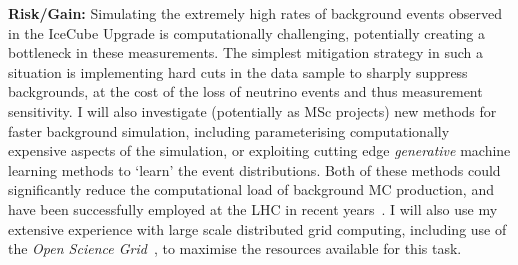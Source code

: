 \documentclass[a4paper,11pt]{article}
\begin{document}






\textbf{Risk/Gain:} Simulating the extremely high rates of background events observed in the IceCube Upgrade is computationally challenging, potentially creating a bottleneck in these measurements. The simplest mitigation strategy in such a situation is implementing hard cuts in the data sample to sharply suppress backgrounds, at the cost of the loss of neutrino events and thus measurement sensitivity. I will also investigate (potentially as MSc projects) new methods for faster background simulation, including parameterising computationally expensive aspects of the simulation, or exploiting cutting edge \textit{generative} machine learning methods to `learn' the event distributions. Both of these methods could significantly reduce the computational load of background MC production, and have been successfully employed at the LHC in recent years~\cite{Barberio:2009zza, ATLAS:2010bfa, Paganini:2017hrr}. I will also use my extensive experience with large scale distributed grid computing, including use of the \textit{Open Science Grid}~\cite{osg07, osg09}, to maximise the resources available for this task. \\
\end{document}
